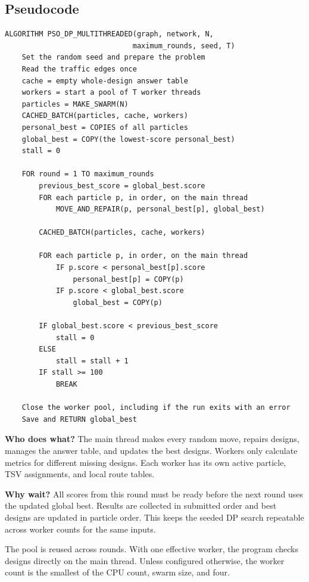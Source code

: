 \documentclass[11pt,a4paper]{article}
\begin{document}
\subsection*{Pseudocode}
\begin{lstlisting}
ALGORITHM PSO_DP_MULTITHREADED(graph, network, N,
                              maximum_rounds, seed, T)
    Set the random seed and prepare the problem
    Read the traffic edges once
    cache = empty whole-design answer table
    workers = start a pool of T worker threads
    particles = MAKE_SWARM(N)
    CACHED_BATCH(particles, cache, workers)
    personal_best = COPIES of all particles
    global_best = COPY(the lowest-score personal_best)
    stall = 0

    FOR round = 1 TO maximum_rounds
        previous_best_score = global_best.score
        FOR each particle p, in order, on the main thread
            MOVE_AND_REPAIR(p, personal_best[p], global_best)

        CACHED_BATCH(particles, cache, workers)

        FOR each particle p, in order, on the main thread
            IF p.score < personal_best[p].score
                personal_best[p] = COPY(p)
            IF p.score < global_best.score
                global_best = COPY(p)

        IF global_best.score < previous_best_score
            stall = 0
        ELSE
            stall = stall + 1
        IF stall >= 100
            BREAK

    Close the worker pool, including if the run exits with an error
    Save and RETURN global_best
\end{lstlisting}

\textbf{Who does what?} The main thread makes every random move, repairs
designs, manages the answer table, and updates the best designs. Workers
only calculate metrics for different missing designs. Each worker has its
own active particle, TSV assignments, and local route tables.

\textbf{Why wait?} All scores from this round must be ready before the
next round uses the updated global best. Results are collected in submitted
order and best designs are updated in particle order. This keeps the seeded
DP search repeatable across worker counts for the same inputs.

The pool is reused across rounds. With one effective worker, the program
checks designs directly on the main thread. Unless configured otherwise,
the worker count is the smallest of the CPU count, swarm size, and four.
\end{document}
